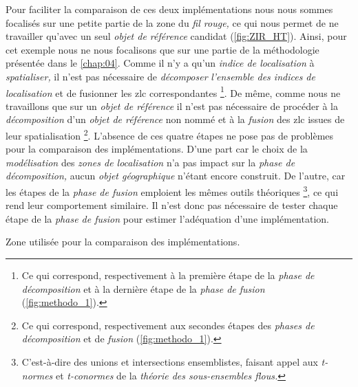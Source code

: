 Pour faciliter la comparaison de ces deux implémentations nous nous
sommes focalisés sur une petite partie de la zone du \emph{fil rouge,}
ce qui nous permet de ne travailler qu'avec un seul \emph{objet de
  référence} candidat (\autoref{fig:ZIR_HT}). Ainsi, pour cet exemple
nous ne nous focalisons que sur une partie de la méthodologie
présentée dans le \autoref{chap:04}. Comme il n'y a qu'un \emph{indice
  de localisation} à \emph{spatialiser,} il n'est pas nécessaire de
\emph{décomposer} \emph{l'ensemble des indices de localisation} et de
fusionner les zlc correspondantes \footnote{Ce qui
  correspond, respectivement à la première étape de la \emph{phase de
    décomposition} et à la dernière étape de la \emph{phase de fusion}
  (\autoref{fig:methodo_1}).}. De même, comme nous ne travaillons que
sur un \emph{objet de référence} il n'est pas nécessaire de procéder à
la \emph{décomposition} d'un \emph{objet de référence} non nommé et à
la \emph{fusion} des zlc issues de leur spatialisation
\footnote{Ce qui correspond, respectivement aux secondes étapes des
  \emph{phases de décomposition} et de \emph{fusion}
  (\autoref{fig:methodo_1}).}. L'absence de ces quatre étapes ne pose
pas de problèmes pour la comparaison des implémentations. D'une part
car le choix de la \emph{modélisation} des \emph{zones de
  localisation} n'a pas impact sur la \emph{phase de décomposition,}
aucun \emph{objet géographique} n'étant encore construit. De l'autre,
car les étapes de la \emph{phase de fusion} emploient les mêmes outils
théoriques \footnote{C'est-à-dire des unions et intersections
  ensemblistes, faisant appel aux \emph{t-normes} et \emph{t-conormes}
  de la \emph{théorie des sous-ensembles flous.}}, ce qui rend leur
comportement similaire. Il n'est donc pas nécessaire de tester chaque
étape de la \emph{phase de fusion} pour estimer l'adéquation d'une
implémentation.

\begin{carte}
  \centering 
  \caption{Zone utilisée pour la comparaison des implémentations.}
  \label{fig:ZIR_HT}
\end{carte}

